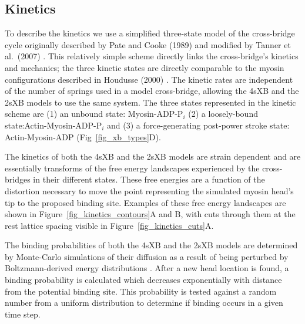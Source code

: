 \documentclass[10pt]{article}
\newcommand{\citep}[1]{\cite{#1}} %
\begin{document}
\subsection*{Kinetics} %

To describe the kinetics we use a simplified three-state model of the cross-bridge cycle originally described by Pate and Cooke (1989) \citep{Pate1989} and modified by Tanner et al.~(2007) \citep{Tanner2007}. 
This relatively simple scheme directly links the cross-bridge's kinetics and mechanics; the three kinetic states are directly comparable to the myosin configurations described in Houdusse (2000) \citep{Houdusse2000}. 
The kinetic rates are independent of the number of springs used in a model cross-bridge, allowing the 4sXB and the 2sXB models to use the same system. 
The three states represented in the kinetic scheme are (1) an unbound state: Myosin-ADP-P$_i$ (2) a loosely-bound state:Actin-Myosin-ADP-P$_i$ and (3) a force-generating post-power stroke state: Actin-Myosin-ADP (Fig~\ref{fig_xb_types}D).

The kinetics of both the 4sXB and the 2sXB models are strain dependent and are essentially transforms of the free energy landscapes experienced by the cross-bridges in their different states.
These free energies are a function of the distortion necessary to move the point representing the simulated myosin head's tip to the proposed binding site. 
Examples of these free energy landscapes are shown in Figure~\ref{fig_kinetics_contours}A and B, with cuts through them at the rest lattice spacing visible in Figure~\ref{fig_kinetics_cuts}A.

The binding probabilities of both the 4sXB and the 2sXB models are determined by Monte-Carlo simulations of their diffusion as a result of being perturbed by Boltzmann-derived energy distributions \citep{DillBook}. 
After a new head location is found, a binding probability is calculated which decreases exponentially with distance from the potential binding site. 
This probability is tested against a random number from a uniform distribution to determine if binding occurs in a given time step.
\end{document}
